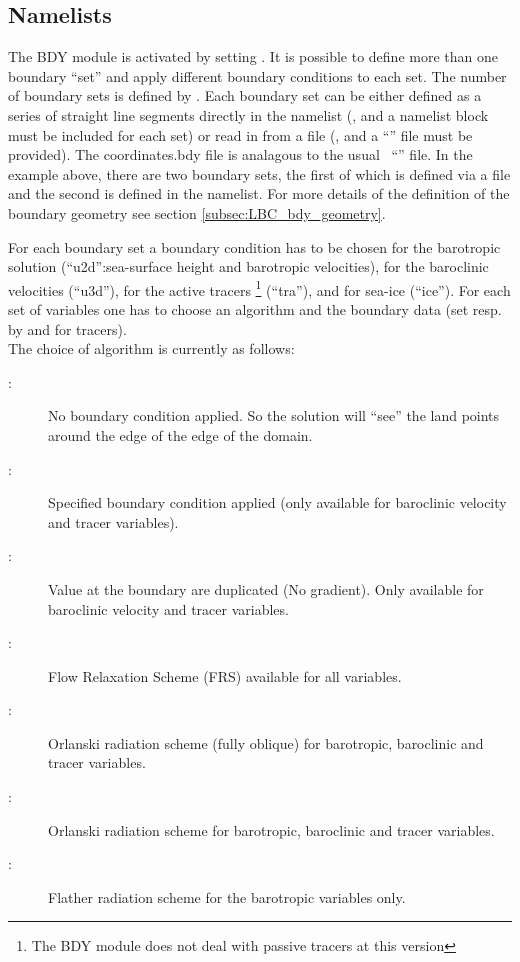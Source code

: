 \documentclass[../main/NEMO_manual]{subfiles}
\begin{document}
\subsection{Namelists}
\label{subsec:LBC_bdy_namelist}

The BDY module is activated by setting  .
It is possible to define more than one boundary ``set'' and apply different boundary conditions to each set.
The number of boundary sets is defined by .
Each boundary set can be either defined as a series of straight line segments directly in the namelist
(, and a namelist block  must be included for each set) or read in from a file (, and a ``'' file must be provided).
The coordinates.bdy file is analagous to the usual \NEMO\ ``'' file.
In the example above, there are two boundary sets, the first of which is defined via a file and
the second is defined in the namelist.
For more details of the definition of the boundary geometry see section \autoref{subsec:LBC_bdy_geometry}.

For each boundary set a boundary condition has to be chosen for the barotropic solution
(``u2d'':sea-surface height and barotropic velocities), for the baroclinic velocities (``u3d''),
for the active tracers \footnote{The BDY module does not deal with passive tracers at this version} (``tra''), and for sea-ice (``ice'').
For each set of variables one has to choose an algorithm and the boundary data (set resp. by  and  for tracers).\\

The choice of algorithm is currently as follows:

\begin{description}
\item [:] No boundary condition applied.
  So the solution will ``see'' the land points around the edge of the edge of the domain.
\item [:] Specified boundary condition applied (only available for baroclinic velocity and tracer variables).
\item [:] Value at the boundary are duplicated (No gradient). Only available for baroclinic velocity and tracer variables.
\item [:] Flow Relaxation Scheme (FRS) available for all variables.
\item [:] Orlanski radiation scheme (fully oblique) for barotropic, baroclinic and tracer variables.
\item [:] Orlanski radiation scheme for barotropic, baroclinic and tracer variables.
\item [:] Flather radiation scheme for the barotropic variables only.
\end{description}
\end{document}
